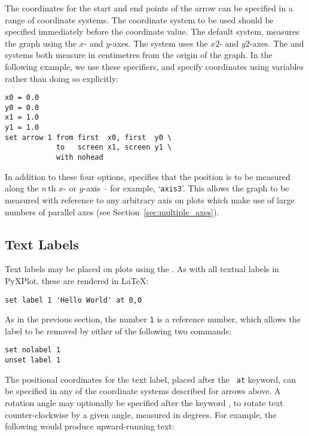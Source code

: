 The coordinates for the start and end points of the arrow can be specified in
a range of coordinate systems. The coordinate system to be used should be
specified immediately before the coordinate value. The default system,
 measures the graph using the $x$- and $y$-axes. The
 system uses the $x2$- and $y2$-axes. The  and
 systems both measure in centimetres from the origin of the
graph. In the following example, we use these specifiers, and specify
coordinates using variables rather than doing so explicitly:

\begin{verbatim}
x0 = 0.0
y0 = 0.0
x1 = 1.0
y1 = 1.0
set arrow 1 from first  x0, first  y0 \
            to   screen x1, screen y1 \
            with nohead
\end{verbatim}

In addition to these four options,  specifies that the
position is to be measured along the $n\,$th $x$- or $y$-axis -- for example,
`{\tt axis3}'.\indcmd{set arrow} This allows the graph to be measured with
reference to any arbitrary axis on plots which make use of large numbers of
parallel axes (see Section~\ref{sec:multiple_axes}).

\subsection{Text Labels}

Text labels may be placed on plots using the . As with all
textual labels in PyXPlot, these are rendered in \LaTeX:

\begin{verbatim}
set label 1 'Hello World' at 0,0
\end{verbatim}

As in the previous section, the number {\tt 1} is a reference number, which
allows the label to be removed by either of the following two commands:

\begin{verbatim}
set nolabel 1
unset label 1
\end{verbatim}

\noindent The positional coordinates for the text label, placed after the {\tt
at} keyword, can be specified in any of the coordinate systems described for
arrows above. A rotation angle may optionally be specified after the keyword
\indkeyt{rotate}, to rotate text counter-clockwise by a given angle, measured
in degrees. For example, the following would produce upward-running text:

